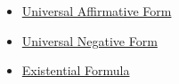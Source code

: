 \begin{dependencies}
\begin{itemize}
  \item \hyperref[def:categorical-a-form-predicate-logic]{Universal Affirmative Form}
  \item \hyperref[def:categorical-e-form-predicate-logic]{Universal Negative Form}
  \item \hyperref[def:existential-q]{Existential Formula}
\end{itemize}
\end{dependencies}
